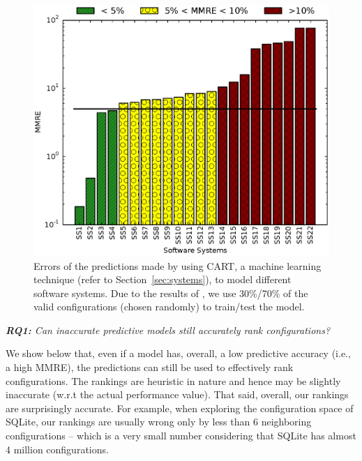 \begin{figure}[t]
\centering
\includegraphics[scale=0.35]{Chapter-Rank/figures/figure1}
\caption[Errors of the predictions made by using CART, to model different
software systems.]{{\small Errors of the predictions made by using CART, a machine learning technique (refer to Section~\ref{sec:systems}), to model different
software systems. Due to the results of , we use  30\%/70\% of the  valid configurations (chosen randomly) to train/test the model. }
}
\label{fig:model_efficiency}
\end{figure}


  \noindent
  {\em  {\bf RQ1:}  Can  inaccurate predictive  models still accurately rank
configurations?}

We show below that,   even if a model has, overall, a low predictive accuracy (i.e., a high MMRE), the
predictions can still be used to effectively rank configurations.
The rankings are heuristic in nature and hence may be slightly inaccurate (w.r.t the actual performance value).
That said, overall, our rankings are surprisingly accurate. For example,
when exploring the configuration space of SQLite, our 
rankings are usually wrong only by less than 6 neighboring configurations -- which is a very small number
considering that SQLite has almost 4 million configurations.


